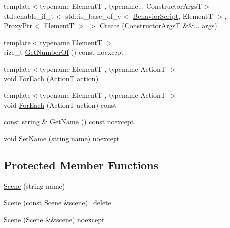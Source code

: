 \begin{DoxyCompactItemize}
\item 
{\footnotesize template$<$typename ElementT , typename... Constructor\+ArgsT$>$ }\\std\+::enable\+\_\+if\+\_\+t$<$ std\+::is\+\_\+base\+\_\+of\+\_\+v$<$ \hyperlink{classmage_1_1_behavior_script}{Behavior\+Script}, ElementT $>$, \hyperlink{classmage_1_1_proxy_ptr}{Proxy\+Ptr}$<$ ElementT $>$ $>$ \hyperlink{classmage_1_1_scene_ab135fe20ddadf6c1e2820a9582a31e64}{Create} (Constructor\+ArgsT \&\&... args)
\item 
{\footnotesize template$<$typename ElementT $>$ }\\size\+\_\+t \hyperlink{classmage_1_1_scene_a308480749d009dad3a39333fd0c59f2a}{Get\+Number\+Of} () const noexcept
\item 
{\footnotesize template$<$typename ElementT , typename ActionT $>$ }\\void \hyperlink{classmage_1_1_scene_a72998c69cf486d1f2671a2570b2f8905}{For\+Each} (ActionT action)
\item 
{\footnotesize template$<$typename ElementT , typename ActionT $>$ }\\void \hyperlink{classmage_1_1_scene_a839971fb614f9bb669ddb511173740dc}{For\+Each} (ActionT action) const
\item 
const string \& \hyperlink{classmage_1_1_scene_a6afd25c30d08eb579eb430af49cf8fc0}{Get\+Name} () const noexcept
\item 
void \hyperlink{classmage_1_1_scene_ae5e0a4daa62322ff18d673944ad4e0e8}{Set\+Name} (string name) noexcept
\end{DoxyCompactItemize}
\subsection*{Protected Member Functions}
\begin{DoxyCompactItemize}
\item 
\hyperlink{classmage_1_1_scene_aaed505892f2a639db47e5d5767f41337}{Scene} (string name)
\item 
\hyperlink{classmage_1_1_scene_a88d83ccb2e10549d5370f850b2b4c228}{Scene} (const \hyperlink{classmage_1_1_scene}{Scene} \&scene)=delete
\item 
\hyperlink{classmage_1_1_scene_afeae10a3a50bf1d624faa6bd0bf33a7d}{Scene} (\hyperlink{classmage_1_1_scene}{Scene} \&\&scene) noexcept
\end{DoxyCompactItemize}
